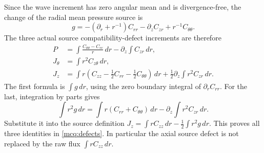Since the wave increment has zero angular mean and is divergence-free,
the change of the radial mean pressure source is
\[
 g=-(\partial_r+r^{-1})C_{rr}-\partial_zC_{zr}+r^{-1}C_{\theta\theta}.
\]
The three actual source compatibility-defect increments are therefore
\begin{equation}\label{mcq:defects}
\begin{split}
 P&=\int\frac{C_{\theta\theta}-C_{rr}}r\,dr
                    -\partial_z\int C_{zr}\,dr,\\
 J_\theta&=\int r^2C_{z\theta}\,dr,\\
 J_z&=\int r\left(C_{zz}-\tfrac12C_{rr}
                              -\tfrac12C_{\theta\theta}\right)\,dr
                  +\tfrac12\partial_z\int r^2C_{zr}\,dr .
\end{split}
\end{equation}
The first formula is \(\int g\,dr\), using the zero boundary integral
of \(\partial_r C_{rr}\). For the last, integration by parts gives
\[
 \int r^2 g\,dr
  =\int r(C_{rr}+C_{\theta\theta})\,dr
                      -\partial_z\int r^2C_{zr}\,dr .
\]
Substitute it into the source definition
\(J_z=\int rC_{zz}\,dr-\frac12\int r^2g\,dr\).
This proves all three identities in \eqref{mcq:defects}.
In particular the axial source defect is not replaced by the raw flux
\(\int rC_{zz}\,dr\).

